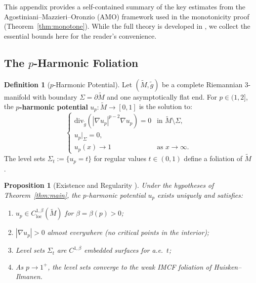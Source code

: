 \documentclass[12pt]{article}
\theoremstyle{plain}
\newtheorem{proposition}[theorem]{Proposition}
\theoremstyle{definition}
\newtheorem{definition}[theorem]{Definition}
\theoremstyle{remark}
\newcommand{\Div}{\mathrm{div}}
\newcommand{\tM}{\tilde{M}}
\newcommand{\tg}{\tilde{g}}
\newcommand{\Hoelder}{\beta}
\begin{document}
This appendix provides a self-contained summary of the key estimates from the Agostiniani--Mazzieri--Oronzio (AMO) framework \cite{amo2022} used in the monotonicity proof (Theorem~\ref{thm:monotone}). While the full theory is developed in \cite{amo2022}, we collect the essential bounds here for the reader's convenience.

\subsection{The \texorpdfstring{$p$}{p}-Harmonic Foliation}

\begin{definition}[$p$-Harmonic Potential]\label{def:p-harmonic-app}
Let $(\tM, \tg)$ be a complete Riemannian 3-manifold with boundary $\Sigma = \partial\tM$ and one asymptotically flat end. For $p \in (1, 2]$, the \textbf{$p$-harmonic potential} $u_p: \tM \to [0,1]$ is the solution to:
\begin{equation}\label{eq:p-harmonic-app}
\begin{cases}
\Div_{\tg}(|\nabla u_p|^{p-2}\nabla u_p) = 0 & \text{in } \tM \setminus \Sigma, \\
u_p|_\Sigma = 0, \\
u_p(x) \to 1 & \text{as } x \to \infty.
\end{cases}
\end{equation}
The level sets $\Sigma_t := \{u_p = t\}$ for regular values $t \in (0,1)$ define a foliation of $\tM$.
\end{definition}

\begin{proposition}[Existence and Regularity {\cite[Theorem~2.3]{amo2022}}]\label{prop:p-harmonic-exist-app}
Under the hypotheses of Theorem~\ref{thm:main}, the $p$-harmonic potential $u_p$ exists uniquely and satisfies:
\begin{enumerate}[label=\textup{(\roman*)}]
    \item $u_p \in C^{1,\Hoelder}_{\mathrm{loc}}(\tM)$ for $\Hoelder = \Hoelder(p) > 0$;
    \item $|\nabla u_p| > 0$ almost everywhere (no critical points in the interior);
    \item Level sets $\Sigma_t$ are $C^{1,\Hoelder}$ embedded surfaces for a.e.\ $t$;
    \item As $p \to 1^+$, the level sets converge to the weak IMCF foliation of Huisken--Ilmanen.
\end{enumerate}
\end{proposition}
\end{document}
